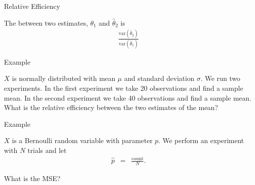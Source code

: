 \begin{frame}{Relative Efficiency}

  \begin{definition}
    The  between two estimates,
    $\hat{\theta}_1$ and $\hat{\theta}_2$ is
    \begin{eqnarray*}
      \frac{\mathrm{var}\left( \hat{\theta}_2\right) }{\mathrm{var}\left( \hat{\theta}_1\right) }
    \end{eqnarray*}
  \end{definition}
  
\end{frame}


\begin{frame}{Example}

  $X$ is normally distributed with mean $\mu$ and standard deviation
  $\sigma$. We run two experiments. In the first experiment we take 20
  observations and find a sample mean. In the second experiment we
  take 40 observations and find a sample mean. What is the relative
  efficiency between the two estimates of the mean?
  
\end{frame}


\begin{frame}{Example}

  $X$ is a Bernoulli random variable with parameter $p$. We perform an
  experiment with $N$ trials and let
  \begin{eqnarray*}
    \hat{p} & = & \frac{\mathrm{count}}{N}.
  \end{eqnarray*}

  What is the MSE?
  
\end{frame}

